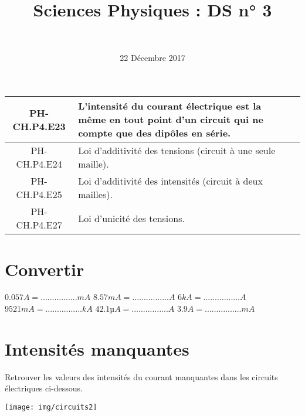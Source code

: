 \documentclass[a4paper,11pt]{exam}
\author{\ }
\date{22 Décembre 2017}
\title{Sciences Physiques : DS n° 3}
\begin{document}
%	

	\maketitle
\vspace*{-0.5cm}	

\begin{scriptsize}
	
\begin{center}
	\begin{tabular}{@{\ }c@{\ }||@{\ }l@{\ }|@{\ $\qquad$}l@{\ }|}
		\hline
		PH-CH.P4.E23 & L’intensité du courant électrique est la même en tout point d’un circuit qui ne compte que des dipôles en série. &  \\
		\hline
		PH-CH.P4.E24 & Loi d’additivité des tensions (circuit à une seule maille). &  \\
		\hline
		PH-CH.P4.E25 & Loi d’additivité des intensités (circuit à deux mailles). &  \\
		\hline
		PH-CH.P4.E27 & Loi d’unicité des tensions. &  \\
		\hline
	\end{tabular}
\end{center}

\end{scriptsize}
%


\section{Convertir}

\begin{questions}
	\begin{multicols}{3}
		
	\question $\num{0.057} A = ................ mA$
	\question $\num{8.57} mA = ................ A$
	\question $\num{6} kA = ................ A$
	\question $\num{9521} mA = ................ kA$
	\question $\num{42.1} µA = ................ A$
	\question $\num{3.9} A = ................ mA$
	
	\end{multicols}
	
\end{questions}



\newpage 



%

\newpage

\section{Intensités manquantes}

Retrouver les valeurs des intensités du courant manquantes dans les circuits électriques ci-dessous. 

\begin{center}
	\texttt{[image: img/circuits2]}
\end{center}


\fillwithdottedlines{5cm}




%




\ \label{LastPage}
\end{document}
